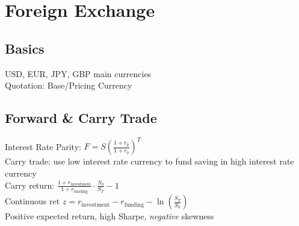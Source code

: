 \section{Foreign Exchange}
	\subsection*{Basics}
	USD, EUR, JPY, GBP main currencies\\
	Quotation: Base/Pricing Currency
	
	\subsection*{Forward \& Carry Trade}
	Interest Rate Parity: $F = S\left(\frac{1 + r_{p}}{1 + r_{b}}\right)^{T}$\\
	Carry trade: use low interest rate currency to fund saving in high interest rate currency\\
	Carry return: $\frac{1 + r_{\text{investment}}}{1 + r_{\text{funding}}}\cdot\frac{S_{0}}{S_{T}} - 1$\\
	Continuous ret $z = r_{\text{investment}} - r_{\text{funding}} - \ln\left(\frac{S_{T}}{S_{0}}\right)$\\
	Positive expected return, high Sharpe, \emph{negative} skewness
	